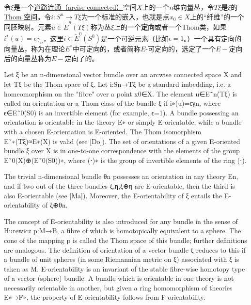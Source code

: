 
令$\xi$是一个\href{https://encyclopediaofmath.org/wiki/Path-connected_space}{道路连通（arcise connected）}空间$X$上的一个$n$维向量丛，令$T\xi$是$\xi$的\href{https://encyclopediaofmath.org/wiki/Thom_space}{Thom 空间}。令$i:S^n\to T\xi$为一个标准的嵌入，也就是点$x_0\in X$上的“纤维”的一个同胚映射。元素$u\in \widetilde{E}^n(T\xi)$称为丛$\xi$上的一个\textbf{定向}或者一个Thom类，如果$i^*(u)=\epsilon \gamma_n$，这里$i\in\widetilde{E}^0(S^0)$是一个可逆元素（比如$\epsilon=1$。）一个具有定向的向量丛，称为在理论$E^*$中可定向的，或者简称$E$-可定向的，选定了一个$E-$定向后的向量丛称为$E-$定向了的。

Let ξ be an n-dimensional vector bundle over an arcwise connected space X and let Tξ be the Thom space of ξ. Let i:Sn→Tξ be a standard imbedding, i.e. a homeomorphism on the "fibre" over a point x0∈X. The element u∈E˜n(Tξ) is called an orientation or a Thom class of the bundle ξ if i∗(u)=ϵγn, where ϵ∈E˜0(S0) is an invertible element (for example, ϵ=1). A bundle possessing an orientation is orientable in the theory E∗ or simply E-orientable, while a bundle with a chosen E-orientation is E-oriented. The Thom isomorphism E˜∗(Tξ)≈E∗(X) is valid (see [Do]). The set of orientations of a given E-oriented bundle ξ over X is in one-to-one correspondence with the elements of the group E˜0(X)⊕(E˜0(S0))∗, where (⋅)∗ is the group of invertible elements of the ring (⋅).

The trivial n-dimensional bundle θn possesses an orientation in any theory En, and if two out of the three bundles ξ,η,ξ⊕η are E-orientable, then the third is also E-orientable (see [Ma]). Moreover, the E-orientability of ξ entails the E-orientability of ξ⊕θn.

The concept of E-orientability is also introduced for any bundle in the sense of Hurewicz p:M→B, a fibre of which is homotopically equivalent to a sphere. The cone of the mapping p is called the Thom space of this bundle; further definitions are analogous. The definition of orientation of a vector bundle ξ reduces to this if a bundle of unit spheres (in some Riemannian metric on ξ) associated with ξ is taken as M. E-orientability is an invariant of the stable fibre-wise homotopy type of a vector (sphere) bundle. A bundle which is orientable in one theory is not necessarily orientable in another, but given a ring homomorphism of theories E∗→F∗, the property of E-orientability follows from F-orientability.
















